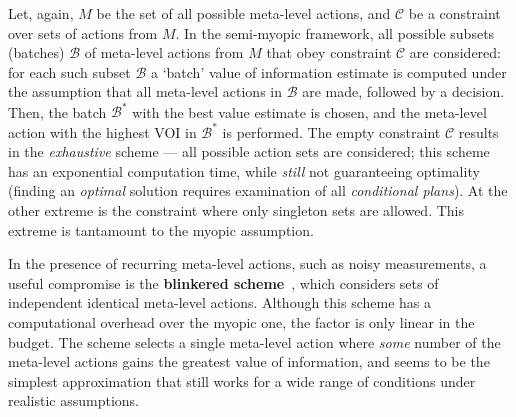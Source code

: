 Let, again, $M$ be the set of all possible meta-level actions, and
${\mathcal C}$ be a constraint over sets of actions from $M$. In the
semi-myopic framework, all possible subsets (batches) ${\mathcal B}$
of meta-level actions from $M$ that obey constraint ${\mathcal C}$ are
considered: for each such subset ${\mathcal B}$ a `batch' value of
information estimate is computed under the assumption that all
meta-level actions in ${\mathcal B}$ are made, followed by a decision.
Then, the batch ${\mathcal B}^*$ with the best
value estimate is chosen, and the meta-level action with the highest
VOI in ${\mathcal B}^*$ is performed.  The empty constraint $\mathcal
C$ results in the {\em exhaustive} scheme --- all possible action sets
are considered; this scheme has an exponential computation time, while
{\em still} not guaranteeing optimality (finding an
\emph{optimal} solution requires examination of all \emph{conditional plans}).
At the other extreme is the constraint where only singleton sets are
allowed. This extreme is tantamount to the myopic assumption.

In the presence of recurring meta-level actions, such as
noisy measurements, a useful compromise is the \textbf{blinkered
scheme}~\cite{TolpinShimony.blinkered}, which considers sets of
independent identical meta-level actions.  Although this scheme has a
computational overhead over the myopic one, the factor is only linear
in the budget.  The scheme selects a single meta-level action where
{\em some} number of the meta-level actions gains the greatest value
of information, and seems to be the simplest approximation that still
works for a wide range of conditions under realistic assumptions.
